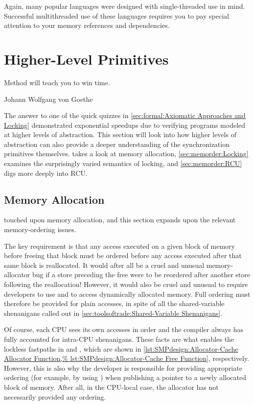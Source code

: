 Again, many popular languages were designed with single-threaded use
in mind.
Successful multithreaded use of these languages requires you to pay
special attention to your memory references and dependencies.

\section{Higher-Level Primitives}
\label{sec:memorder:Higher-Level Primitives}
%
\epigraph{Method will teach you to win time.}
	 {Johann Wolfgang von Goethe}

The answer to one of the quick quizzes in
\cref{sec:formal:Axiomatic Approaches and Locking}
demonstrated exponential speedups due to verifying programs
modeled at higher levels of abstraction.
This section will look into how higher levels of abstraction can
also provide a deeper understanding of the synchronization primitives
themselves.
takes a look at memory allocation,
\cref{sec:memorder:Locking}
examines the surprisingly varied semantics of locking, and
\cref{sec:memorder:RCU}
digs more deeply into RCU\@.

\subsection{Memory Allocation}
\label{sec:memorder:Memory Allocation}

touched upon memory allocation, and this section expands upon the relevant
memory-ordering issues.

The key requirement is that any access executed on a given block of
memory before freeing that block must be ordered before any access
executed after that same block is reallocated.
It would after all be a cruel and unusual memory-allocator bug if a store
preceding the free were to be reordered after another store following
the reallocation!
However, it would also be cruel and unusual to require developers to use
 and  to access dynamically allocated
memory.
Full ordering must therefore be provided for plain accesses, in spite of
all the shared-variable shenanigans called out in
\cref{sec:toolsoftrade:Shared-Variable Shenanigans}.

Of course, each CPU sees its own accesses in order and the compiler
always has fully accounted for intra-CPU shenanigans.
These facts are what enables the lockless fastpaths in
 and , which are shown in
\cref{lst:SMPdesign:Allocator-Cache Allocator Function,%
lst:SMPdesign:Allocator-Cache Free Function},
respectively.
However, this is also why the developer is responsible for providing
appropriate ordering (for example, by using )
when publishing a pointer to a newly allocated block of memory.
After all, in the CPU-local case, the allocator has not necessarily
provided any ordering.

